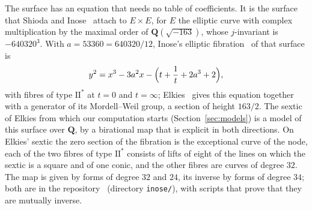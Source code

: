 \documentclass[11pt]{article}
\newcommand{\Q}{\mathbf{Q}}
\theoremstyle{remark}
\begin{document}
The surface has an equation that needs no table of coefficients.  It is the surface that Shioda and Inose~\cite{ShiodaInose}
attach to $E\times E$, for $E$ the elliptic curve with complex multiplication by the maximal order of $\Q(\sqrt{-163})$, whose
$j$-invariant is $-640320^3$.  With $a=53360=640320/12$, Inose's elliptic fibration~\cite{Inose,ShiodaSandwich} of that surface is
\[
y^2 = x^3-3a^2x-\Bigl(t+\frac1t+2a^3+2\Bigr),
\]
with fibres of type $\mathrm{II}^*$ at $t=0$ and $t=\infty$; Elkies~\cite{ElkiesSI} gives this equation together with a
generator of its Mordell--Weil group, a section of height $163/2$.  The sextic of Elkies from which our computation starts
(Section~\ref{sec:models}) is a model of this surface over $\Q$, by a birational map that is explicit in both directions.  On
Elkies' sextic the zero section of the fibration is the exceptional curve of the node, each of the two fibres of type
$\mathrm{II}^*$ consists of lifts of eight of the lines on which the sextic is a square and of one conic, and the other fibres are
curves of degree $32$.  The map is given by forms of degree $32$ and $24$, its inverse by forms of degree $34$; both are in the repository~\cite{Repo} (directory \texttt{inose/}), with scripts that prove
that they are mutually inverse.
\end{document}
